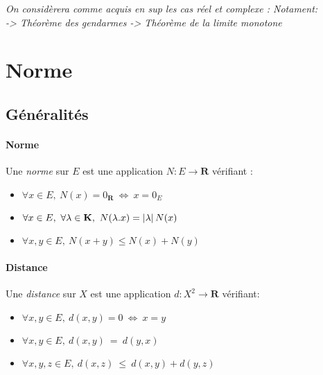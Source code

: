 

\textit{\small On considèrera comme acquis en sup les cas réel et complexe : Notament:\\ -> Théorème des gendarmes \hfill -> Théorème de la limite monotone} \hfill ${}$


\section{Norme}

	\subsection{Généralités}
	
		\vspace{-15pt}
		\traitd
		\paragraph{Norme} Une \emph{norme} sur $E$ est une application $N: E \rightarrow\mathbf{R}$ vérifiant : 
			\begin{itemize}
				\item $\forall x\in E, ~N(x) = 0_{\mathbf{R}} ~\Leftrightarrow ~x=0_E$
				\item $\forall x\in E, ~\forall \lambda \in \mathbf{K} , ~N(\lambda .x) = \left\vert \lambda \right\vert N(x)$
				\item $ \forall x,y \in E, ~N(x+y) \leq N(x)+N(y)$ 
			\end{itemize}
		\trait 
		
			
		\traitd
		\paragraph{Distance} Une \emph{distance} sur $X$ est une application $d:X^2\rightarrow\mathbf{R}$ vérifiant:
			\begin{itemize}
				\item $\forall x,y\in E, ~d(x,y) = 0 ~\Leftrightarrow ~x=y$
				\item $\forall x,y\in E, ~d(x,y)~=~d(y,x)$
				\item $\forall x,y,z\in E, ~d(x,z)~\leq~d(x,y)+d(y,z)$
			\end{itemize}
		\trait
		
